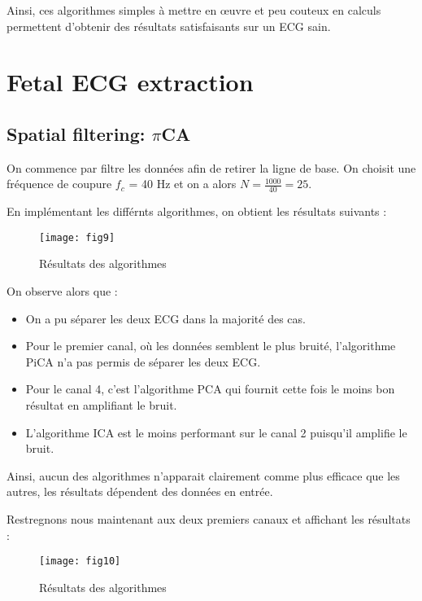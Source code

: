 \documentclass[12pt,a4paper,titlepage]{article}
\begin{document}
Ainsi, ces algorithmes simples à mettre en œuvre et peu couteux en calculs permettent 
d'obtenir des résultats satisfaisants sur un ECG sain.

\section{Fetal ECG extraction}

\subsection{Spatial filtering: $\pi$CA}

On commence par filtre les données afin de retirer la ligne de base. On choisit une
fréquence de coupure $f_c$ = 40 Hz et on a alors $N = \frac{1000}{40} = 25$.

En implémentant les différnts algorithmes, on obtient les résultats suivants :

\begin{figure}[H]
    \caption{Résultats des algorithmes}
    \texttt{[image: fig9]}
    \centering
\end{figure}

On observe alors que :

\begin{itemize}
    \item{On a pu séparer les deux ECG dans la majorité des cas.}
    \item{Pour le premier canal, où les données semblent le plus bruité, l'algorithme
            PiCA n'a pas permis de séparer les deux ECG.}
    \item{Pour le canal 4, c'est l'algorithme PCA qui fournit cette fois le moins bon
            résultat en amplifiant le bruit.}
    \item{L'algorithme ICA est le moins performant sur le canal 2 puisqu'il 
            amplifie le bruit.}
\end{itemize}

Ainsi, aucun des algorithmes n'apparait clairement comme plus efficace que les autres,
les résultats dépendent des données en entrée.

Restregnons nous maintenant aux deux premiers canaux et affichant les résultats :

\begin{figure}[H]
    \caption{Résultats des algorithmes}
    \texttt{[image: fig10]}
    \centering
\end{figure}
\end{document}
